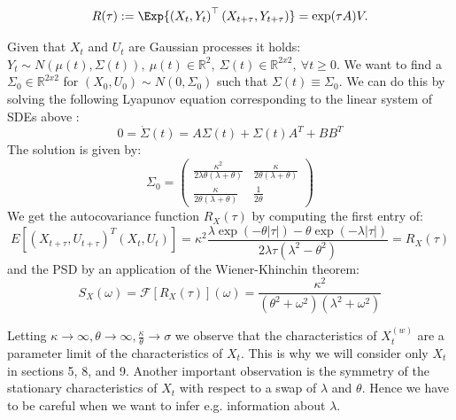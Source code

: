 \documentclass[%
thesis=student,%
coverpage=false,%
titlepage=false,%
headmarks=true, %
english,%
font=libertine, %
math=newpxtx, %
BCOR=5mm,%
coverBCOR=11mm%
]{tumbook}
\begin{document}
\begin{equation*}
R(\tau):=\Exp{\left(X_t,Y_t\right)^\top\left(X_{t+\tau},Y_{t+\tau}\right)}=\exp(\tau A)V.
\end{equation*}


Given that $X_{t}$ and $U_{t}$ are Gaussian processes it holds: $Y_{t} \sim N(\mu(t),\Sigma(t)),\ \mu(t) \in \mathbb{R}^{2}, \ \Sigma(t) \in \mathbb{R}^{2x2}, \ \forall t\geq 0$. We want to find a $\Sigma_{0} \in \mathbb{R}^{2x2}$ for $(X_{0},U_{0}) \sim N(0,\Sigma_{0})$ such that $\Sigma(t) \equiv \Sigma_{0}$. We can do this by solving the following Lyapunov equation corresponding to the linear system of SDEs above \cite{gardiner:2009}: 
\[
0 = \dot{\Sigma}(t) = A\Sigma(t) + \Sigma(t) A^{T} + BB^{T} 
\]
The solution is given by: 
\[
\Sigma_{0} = 
\begin{pmatrix}
    \frac{\kappa^{2}}{2\lambda\theta(\lambda + \theta)} & \frac{\kappa}{2\theta(\lambda + \theta)} \\
    \frac{\kappa}{2\theta(\lambda + \theta)} & \frac{1}{2\theta}
\end{pmatrix}
\]
We get the autocovariance function $R_{X}(\tau)$ by computing the first entry of: 
\[
E[(X_{t+\tau},U_{t+\tau})^{T}(X_{t},U_{t})] = \kappa^{2}\frac{\lambda\exp(-\theta\lvert\tau\rvert)-\theta\exp(-\lambda\lvert\tau\rvert)}{2\lambda\tau(\lambda^{2}-\theta^{2})} = R_{X}(\tau)
\]
and the PSD by an application of the Wiener-Khinchin theorem:
\[
S_{X}(\omega) = \mathcal{F}[R_{X}(\tau)](\omega) = \frac{\kappa^{2}}{(\theta^{2} + \omega^{2})(\lambda^{2} + \omega^{2})}
\]

Letting $\kappa \rightarrow \infty, \theta \rightarrow \infty, \frac{\kappa}{\theta} \rightarrow \sigma$ we observe that the characteristics of $X_{t}^{(w)}$ are a parameter limit of the characteristics of $X_{t}$. This is why we will consider only $X_{t}$ in sections 5, 8, and 9.
Another important observation is the symmetry of the stationary characteristics of $X_{t}$ with respect to a swap of $\lambda$ and $\theta$. Hence we have to be careful when we want to infer e.g. information about $\lambda$.
\end{document}
